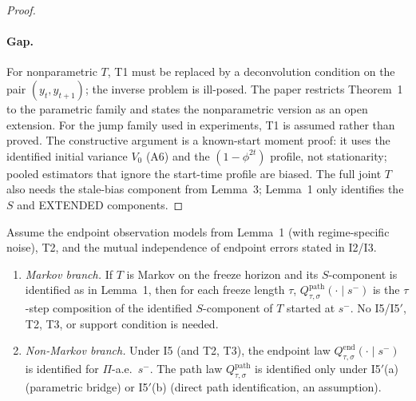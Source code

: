 \begin{proof}
\paragraph{Gap.}
For nonparametric $T$, T1 must be replaced by a deconvolution condition on the
pair $(y_t,y_{t+1})$; the inverse problem is ill-posed.  The paper restricts
Theorem~1 to the parametric family and states the nonparametric version as an
open extension.  For the jump family used in experiments, T1 is assumed rather
than proved.  The constructive argument is a known-start moment proof: it uses
the identified initial variance $V_0$ (A6) and the $(1-\phi^{2t})$ profile, not
stationarity; pooled estimators that ignore the start-time profile are biased.
The full joint $T$ also needs the stale-bias component from Lemma~3; Lemma~1
only identifies the $S$ and EXTENDED components.
\end{proof}

\begin{aIlemB}
Assume the endpoint observation models from Lemma~1 (with regime-specific
noise), T2, and the mutual independence of endpoint errors stated in I2/I3.
\begin{enumerate}
\item[(a)] \emph{Markov branch.}  If $T$ is Markov on the freeze horizon and its
$S$-component is identified as in Lemma~1, then for each freeze length $\tau$,
$Q^{\mathrm{path}}_{\tau,\sigma}(\cdot\mid s^-)$ is the $\tau$-step composition
of the identified $S$-component of $T$ started at $s^-$.  No I5/I5$'$, T2, T3, or
support condition is needed.
\item[(b)] \emph{Non-Markov branch.}  Under I5 (and T2, T3), the endpoint law
$Q^{\mathrm{end}}_{\tau,\sigma}(\cdot\mid s^-)$ is identified for $\Pi$-a.e.\
$s^-$.  The path law $Q^{\mathrm{path}}_{\tau,\sigma}$ is identified only under
I5$'$(a) (parametric bridge) or I5$'$(b) (direct path identification, an
assumption).
\end{enumerate}
\end{aIlemB}

